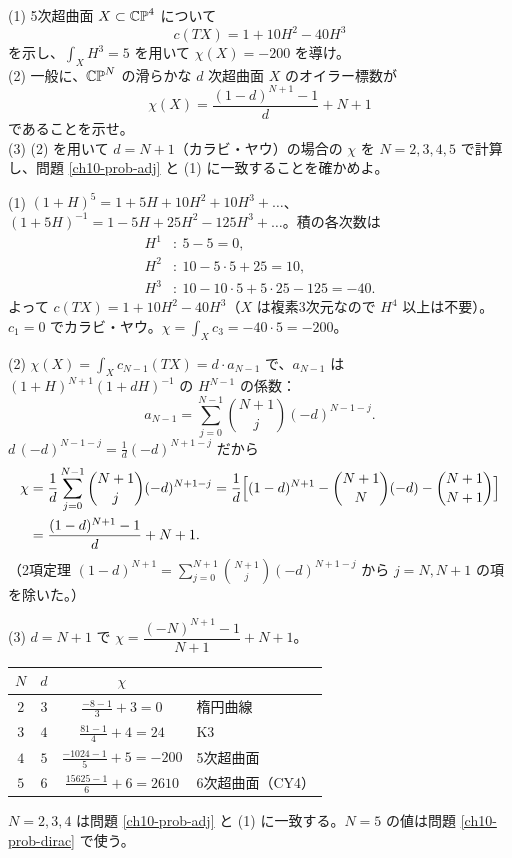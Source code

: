 \begin{problem}[難易度 C]\label{ch10-prob-quintic}
(1) 5次超曲面 $X\subset\mathbb{CP}^4$ について
\[
c(TX)=1+10H^2-40H^3
\]
を示し、$\int_XH^3=5$ を用いて $\chi(X)=-200$ を導け。\\
(2) 一般に、$\mathbb{CP}^N$ の滑らかな $d$ 次超曲面 $X$ のオイラー標数が
\[
\chi(X)=\frac{(1-d)^{N+1}-1}{d}+N+1
\]
であることを示せ。\\
(3) (2) を用いて $d=N+1$（カラビ・ヤウ）の場合の $\chi$ を $N=2,3,4,5$ で計算し、問題 \ref{ch10-prob-adj} と (1) に一致することを確かめよ。
\end{problem}

\begin{solution}
(1) $(1+H)^5=1+5H+10H^2+10H^3+\dots$、$(1+5H)^{-1}=1-5H+25H^2-125H^3+\dots$。積の各次数は
\begin{align*}
H^1&:\ 5-5=0,\\
H^2&:\ 10-5\cdot5+25=10,\\
H^3&:\ 10-10\cdot5+5\cdot25-125=-40.
\end{align*}
よって $c(TX)=1+10H^2-40H^3$（$X$ は複素3次元なので $H^4$ 以上は不要）。$c_1=0$ でカラビ・ヤウ。$\chi=\int_Xc_3=-40\cdot5=-200$。

(2) $\chi(X)=\int_Xc_{N-1}(TX)=d\cdot a_{N-1}$ で、$a_{N-1}$ は $(1+H)^{N+1}(1+dH)^{-1}$ の $H^{N-1}$ の係数：
\[
a_{N-1}=\sum_{j=0}^{N-1}\binom{N+1}{j}(-d)^{N-1-j}.
\]
$d\,(-d)^{N-1-j}=\frac1d(-d)^{N+1-j}$ だから
\begin{align*}
\chi&=\frac1d\sum_{j=0}^{N-1}\binom{N+1}{j}(-d)^{N+1-j}
=\frac1d\Bigl[(1-d)^{N+1}-\binom{N+1}{N}(-d)-\binom{N+1}{N+1}\Bigr]\\
&=\frac{(1-d)^{N+1}-1}{d}+N+1 .
\end{align*}
（2項定理 $(1-d)^{N+1}=\sum_{j=0}^{N+1}\binom{N+1}{j}(-d)^{N+1-j}$ から $j=N,N+1$ の項を除いた。）

(3) $d=N+1$ で $\chi=\dfrac{(-N)^{N+1}-1}{N+1}+N+1$。
\begin{center}
\begin{tabular}{cccl}
$N$ & $d$ & $\chi$ & \\ \hline
$2$ & $3$ & $\frac{-8-1}{3}+3=0$ & 楕円曲線\\
$3$ & $4$ & $\frac{81-1}{4}+4=24$ & K3\\
$4$ & $5$ & $\frac{-1024-1}{5}+5=-200$ & 5次超曲面\\
$5$ & $6$ & $\frac{15625-1}{6}+6=2610$ & 6次超曲面（CY4）
\end{tabular}
\end{center}
$N=2,3,4$ は問題 \ref{ch10-prob-adj} と (1) に一致する。$N=5$ の値は問題 \ref{ch10-prob-dirac} で使う。
\end{solution}

